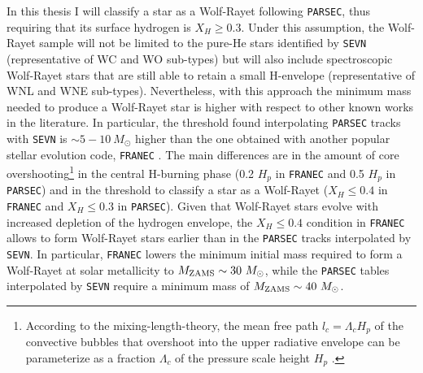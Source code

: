 \documentclass[a4paper,titlepage]{book}     	%
\newcommand{\sun}{\ensuremath{_\odot}}
\newcommand{\mzams}{M_\textup{ZAMS}}
\newcommand{\msun}{\ensuremath{M\sun}}
\begin{document}
In this thesis I will classify a star as a Wolf-Rayet following \texttt{PARSEC}, thus requiring that its surface hydrogen is $X_H \geq 0.3$. Under this assumption, the Wolf-Rayet sample will not be limited to the pure-He stars identified by \texttt{SEVN} (representative of WC and WO sub-types) but will also include spectroscopic Wolf-Rayet stars that are still able to retain a small H-envelope (representative of WNL and WNE sub-types). Nevertheless, with this approach the minimum mass needed to produce a Wolf-Rayet star is higher with respect to other known works in the literature. In particular, the threshold found interpolating \texttt{PARSEC} tracks with \texttt{SEVN} is $\sim 5-10~\msun$ higher than the one obtained with another popular stellar evolution code, \texttt{FRANEC} \cite{Limongi2010_preSNevo}. The main differences are in the amount of core overshooting\footnote{According to the mixing-length-theory, the mean free path $l_c = \Lambda_c H_p$ of the convective bubbles that overshoot into the upper radiative envelope can be parameterize as a fraction $\Lambda_c$ of the pressure scale height $H_p$ \cite{parsec2015_chen}.} in the central H-burning phase (0.2 $H_p$ in \texttt{FRANEC} and 0.5 $H_p$ in \texttt{PARSEC}) and in the threshold to classify a star as a Wolf-Rayet ($X_H \leq 0.4$ in \texttt{FRANEC} and $X_H \leq 0.3$ in \texttt{PARSEC}). Given that Wolf-Rayet stars evolve with increased depletion of the hydrogen envelope, the $X_H \leq 0.4$ condition in \texttt{FRANEC} allows to form Wolf-Rayet stars earlier than in the \texttt{PARSEC} tracks interpolated by \texttt{SEVN}. In particular, \texttt{FRANEC} lowers the minimum initial mass required to form a Wolf-Rayet at solar metallicity to $\mzams \sim 30~\msun$, while the \texttt{PARSEC} tables interpolated by \texttt{SEVN} require a minimum mass of $\mzams \sim 40~\msun$. 
\end{document}
